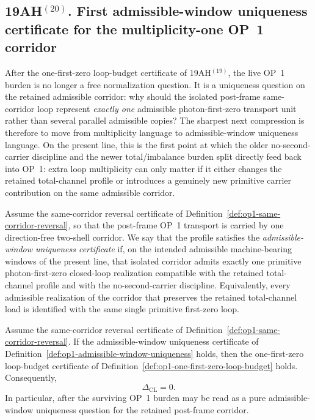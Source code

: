 \subsection*{19AH$^{(20)}$. First admissible-window uniqueness certificate for the multiplicity-one OP~1 corridor}
After the one-first-zero loop-budget certificate of 19AH$^{(19)}$, the live OP~1 burden is no longer a free normalization question. It is a uniqueness question on the retained admissible corridor: why should the isolated post-frame same-corridor loop represent \emph{exactly one} admissible photon-first-zero transport unit rather than several parallel admissible copies? The sharpest next compression is therefore to move from multiplicity language to admissible-window uniqueness language. On the present line, this is the first point at which the older no-second-carrier discipline and the newer total/imbalance burden split directly feed back into OP~1: extra loop multiplicity can only matter if it either changes the retained total-channel profile or introduces a genuinely new primitive carrier contribution on the same admissible corridor.

\begin{definition}
\label{def:op1-admissible-window-uniqueness}
Assume the same-corridor reversal certificate of Definition~\ref{def:op1-same-corridor-reversal}, so that the post-frame OP~1 transport is carried by one direction-free two-shell corridor. We say that the profile satisfies the \emph{admissible-window uniqueness certificate} if, on the intended admissible machine-bearing windows of the present line, that isolated corridor admits exactly one primitive photon-first-zero closed-loop realization compatible with the retained total-channel profile and with the no-second-carrier discipline. Equivalently, every admissible realization of the corridor that preserves the retained total-channel load is identified with the same single primitive first-zero loop.
\end{definition}

\begin{proposition}
\label{prop:op1-admissible-window-uniqueness}
Assume the same-corridor reversal certificate of Definition~\ref{def:op1-same-corridor-reversal}. If the admissible-window uniqueness certificate of Definition~\ref{def:op1-admissible-window-uniqueness} holds, then the one-first-zero loop-budget certificate of Definition~\ref{def:op1-one-first-zero-loop-budget} holds. Consequently,
\[
 \Delta_{\mathrm{CL}} = 0.
\]
In particular, after the surviving OP~1 burden may be read as a pure admissible-window uniqueness question for the retained post-frame corridor.
\end{proposition}

